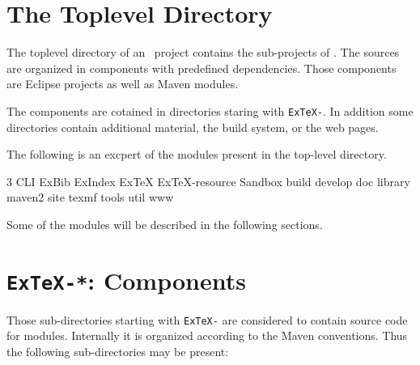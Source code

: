 \section{The Toplevel Directory}

The toplevel directory of an \ExTeX\ project contains the sub-projects
of \ExTeX. The sources are organized in components with predefined
dependencies. Those components are Eclipse projects as well as Maven
modules.

The components are cotained in directories staring with
\texttt{ExTeX-}. In addition some directories contain additional
material, the build system, or the web pages.

The following is an excpert of the modules present in the top-level
directory.

{
\begin{multicols}3 \footnotesize\sf\obeylines
CLI
ExBib
ExIndex
ExTeX
ExTeX-resource
Sandbox
build
develop
doc
library
maven2
site
texmf
tools
util
www
\end{multicols}
}


Some of the modules will be described in the following sections.


\section{\texttt{ExTeX-*}: Components}

Those sub-directories starting with \texttt{ExTeX-} are considered to
contain source code for modules. Internally it is organized according
to the Maven conventions. Thus the following sub-directories may be
present:

